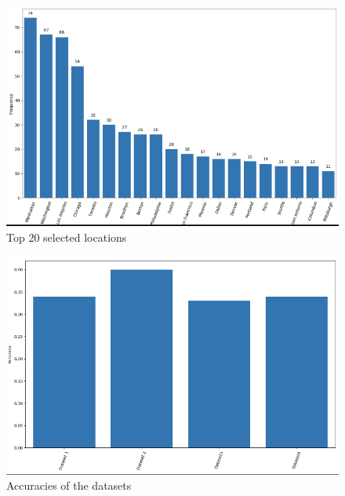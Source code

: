 \documentclass[12pt,svgnames]{report}
\begin{document}
\begin{figure}[H]
	\centering
	\includegraphics[scale = 0.5]{top20cities.png}
	\caption{Top 20 selected locations}
\end{figure}

\begin{figure}[H]
	\centering
	\includegraphics[scale = 0.5]{accuracies.png}
	\caption{Accuracies of the datasets}
\end{figure}



\end{document}
